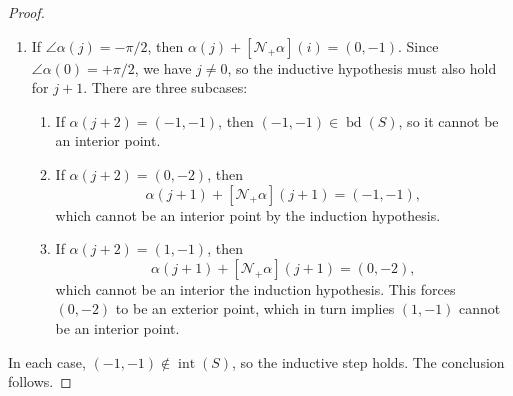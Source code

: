 \begin{proof}
\begin{enumerate}
    \item If $\angle \alpha (j) = -\pi/2$, then $\alpha(j) + [\mathcal{N}_+\alpha](i) = (0, -1)$.
    Since $\angle \alpha(0) = +\pi/2$, we have $j \neq 0$, so the inductive hypothesis must also hold for $j + 1$. 
    There are three subcases:
    \begin{enumerate}
      \item If $\alpha(j+2) = (-1,-1)$, then $(-1, -1) \in \operatorname{bd}(S)$, so it cannot be an interior point.
      \item If $\alpha(j+2) = (0, -2)$, then 
      \begin{equation}
        \alpha(j + 1) + [\mathcal{N}_+\alpha](j + 1) = (-1, -1),
      \end{equation}
      which cannot be an interior point by the induction hypothesis.
      \item If $\alpha(j+2) = (1, -1)$, then
      \begin{equation}
        \alpha(j + 1) + [\mathcal{N}_+\alpha](j + 1) = (0, -2),
      \end{equation}
      which cannot be an interior the induction hypothesis. This forces $(0, -2)$ to be an exterior point, which in turn implies $(1, -1)$ cannot be an interior point.
    \end{enumerate}
  \end{enumerate}
  In each case, $(-1, -1) \not\in \operatorname{int}(S)$, so the inductive step holds. The conclusion follows.
\end{proof}
